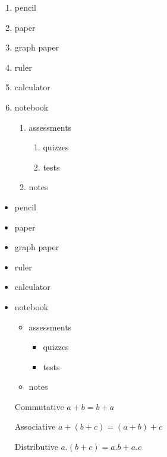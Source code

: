 \documentclass[11pt]{article}
\begin{document}
\begin{enumerate}
\item pencil
\item paper
\item graph paper
\item ruler
\item calculator
\item notebook
	\begin{enumerate}
	\item assessments
		\begin{enumerate}
		\item quizzes
		\item tests
		\end{enumerate}
	\item notes
	\end{enumerate}
\end{enumerate}

\begin{itemize}
\item pencil
\item paper
\item graph paper
\item ruler
\item calculator
\item notebook
	\begin{itemize}
	\item assessments
		\begin{itemize}
		\item quizzes
		\item tests
		\end{itemize}
	\item notes
	\end{itemize}
\end{itemize}

\begin{enumerate}
\item[Commutative] $a+b=b+a$
\item[Associative] $a+(b+c)=(a+b)+c$
\item[Distributive] $a.(b+c)=a.b+a.c$
\end{enumerate}
\end{document}
